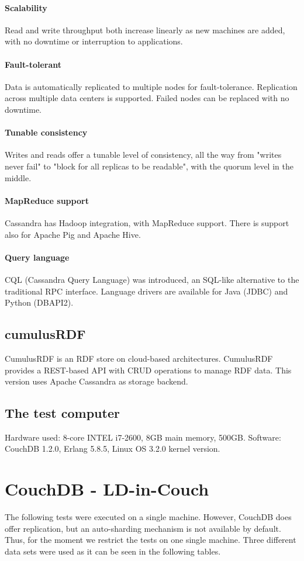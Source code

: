 \documentclass[a4paper,10pt]{article}
\begin{document}
\paragraph{Scalability}
Read and write throughput both increase linearly as new machines are added, with no downtime or interruption to applications.
\paragraph{Fault-tolerant}
Data is automatically replicated to multiple nodes for fault-tolerance. Replication across multiple data centers is supported. 
Failed nodes can be replaced with no downtime.
\paragraph{Tunable consistency}
Writes and reads offer a tunable level of consistency, all the way from "writes never fail" to "block for all replicas to be readable", with the quorum level in the middle.
\paragraph{MapReduce support}
Cassandra has Hadoop integration, with MapReduce support. There is support also for Apache Pig and Apache Hive.
\paragraph{Query language}
CQL (Cassandra Query Language) was introduced, an SQL-like alternative to the traditional RPC interface. Language drivers are available for Java (JDBC) and Python (DBAPI2).

\subsection{cumulusRDF}
CumulusRDF is an RDF store on cloud-based architectures. CumulusRDF provides a REST-based API with CRUD operations to manage RDF data. 
This version uses Apache Cassandra as storage backend.

\subsection{The test computer}
Hardware used: 8-core INTEL i7-2600, 8GB main memory, 500GB. \newline
Software: CouchDB 1.2.0, Erlang 5.8.5, Linux OS 3.2.0 kernel version. 

\section{CouchDB - LD-in-Couch}
The following tests were executed on a single machine. However, CouchDB does offer replication, but an auto-sharding mechanism is not available by default. Thus, 
for the moment we restrict the tests on one single machine. Three different data sets were used as it can be seen in the following tables. 
\end{document}
